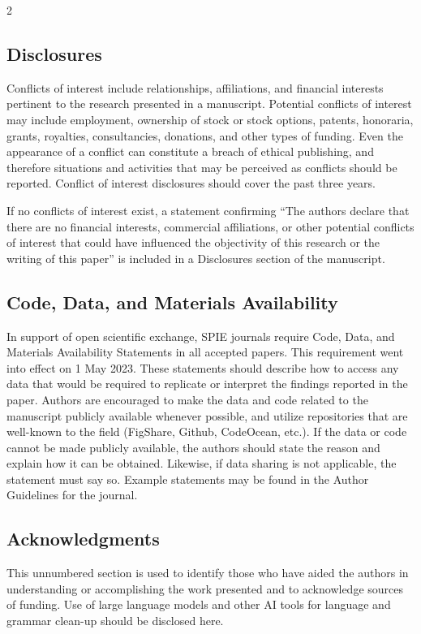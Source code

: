 \documentclass[12pt]{spieman}  %
\begin{document}
\begin{spacing}{2}
\vspace{2ex}

\subsection*{Disclosures}
Conflicts of interest include relationships, affiliations, and financial interests pertinent to the research presented in a manuscript. Potential conflicts of interest may include employment, ownership of stock or stock options, patents, honoraria, grants, royalties, consultancies, donations, and other types of funding. Even the appearance of a conflict can constitute a breach of ethical publishing, and therefore situations and activities that may be perceived as conflicts should be reported. Conflict of interest disclosures should cover the past three years. 

If no conflicts of interest exist, a statement confirming “The authors declare that there are no financial interests, commercial affiliations, or other potential conflicts of interest that could have influenced the objectivity of this research or the writing of this paper” is included in a Disclosures section of the manuscript.



\subsection* {Code, Data, and Materials Availability} 
In support of open scientific exchange, SPIE journals require Code, Data, and Materials Availability Statements in all accepted papers. This requirement went into effect on 1 May 2023. These statements should describe how to access any data that would be required to replicate or interpret the findings reported in the paper. Authors are encouraged to make the data and code related to the manuscript publicly available whenever possible, and utilize repositories that are well-known to the field (FigShare, Github, CodeOcean, etc.). If the data or code cannot be made publicly available, the authors should state the reason and explain how it can be obtained. Likewise, if data sharing is not applicable, the statement must say so. Example statements may be found in the Author Guidelines for the journal.


\subsection* {Acknowledgments}
This unnumbered section is used to identify those who have aided the authors in understanding or accomplishing the work presented and to acknowledge sources of funding. Use of large language models and other AI tools for language and grammar clean-up should be disclosed here. 



\end{spacing}
\end{document}
